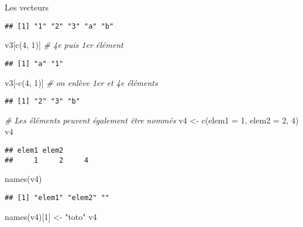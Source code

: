 \documentclass[10pt,xcolor=table,color={dvipsnames,usenames},ignorenonframetext,usepdftitle=false,french]{beamer}
\newenvironment{Shaded}{\begin{snugshade}}{\end{snugshade}}
\newcommand{\AttributeTok}[1]{\textcolor[rgb]{0.77,0.63,0.00}{#1}}
\newcommand{\CommentTok}[1]{\textcolor[rgb]{0.56,0.35,0.01}{\textit{#1}}}
\newcommand{\DecValTok}[1]{\textcolor[rgb]{0.00,0.00,0.81}{#1}}
\newcommand{\FunctionTok}[1]{\textcolor[rgb]{0.00,0.00,0.00}{#1}}
\newcommand{\NormalTok}[1]{#1}
\newcommand{\OtherTok}[1]{\textcolor[rgb]{0.56,0.35,0.01}{#1}}
\newcommand{\SpecialCharTok}[1]{\textcolor[rgb]{0.00,0.00,0.00}{#1}}
\newcommand{\StringTok}[1]{\textcolor[rgb]{0.31,0.60,0.02}{#1}}
\begin{document}
\begin{frame}{Les vecteurs}
\begin{verbatim}
## [1] "1" "2" "3" "a" "b"
\end{verbatim}

\begin{Shaded}
\begin{Highlighting}[]
\NormalTok{v3[}\FunctionTok{c}\NormalTok{(}\DecValTok{4}\NormalTok{, }\DecValTok{1}\NormalTok{)] }\CommentTok{\# 4e puis 1er élément}
\end{Highlighting}
\end{Shaded}

\begin{verbatim}
## [1] "a" "1"
\end{verbatim}

\begin{Shaded}
\begin{Highlighting}[]
\NormalTok{v3[}\SpecialCharTok{{-}}\FunctionTok{c}\NormalTok{(}\DecValTok{4}\NormalTok{, }\DecValTok{1}\NormalTok{)] }\CommentTok{\# on enlève 1er et 4e éléments}
\end{Highlighting}
\end{Shaded}

\begin{verbatim}
## [1] "2" "3" "b"
\end{verbatim}

\begin{Shaded}
\begin{Highlighting}[]
\CommentTok{\# Les éléments peuvent également être nommés}
\NormalTok{v4 }\OtherTok{\textless{}{-}} \FunctionTok{c}\NormalTok{(}\AttributeTok{elem1 =} \DecValTok{1}\NormalTok{, }\AttributeTok{elem2 =} \DecValTok{2}\NormalTok{, }\DecValTok{4}\NormalTok{)}
\NormalTok{v4}
\end{Highlighting}
\end{Shaded}

\begin{verbatim}
## elem1 elem2       
##     1     2     4
\end{verbatim}

\begin{Shaded}
\begin{Highlighting}[]
\FunctionTok{names}\NormalTok{(v4)}
\end{Highlighting}
\end{Shaded}

\begin{verbatim}
## [1] "elem1" "elem2" ""
\end{verbatim}

\begin{Shaded}
\begin{Highlighting}[]
\FunctionTok{names}\NormalTok{(v4)[}\DecValTok{1}\NormalTok{] }\OtherTok{\textless{}{-}} \StringTok{"toto"}
\NormalTok{v4}
\end{Highlighting}
\end{Shaded}


\end{frame}
\end{document}
